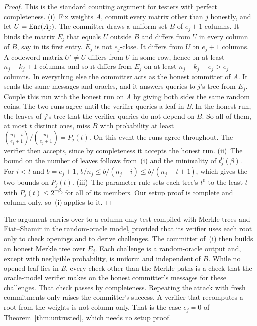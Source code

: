\begin{proof}
This is the standard counting argument for testers with perfect completeness.
(i)~Fix weights $A$, commit every matrix other than $j$ honestly, and let $U=\mathrm{Enc}(A_j)$. The
committer draws a uniform set $B$ of $e_j+1$ columns. It binds the matrix $E_j$ that equals $U$
outside $B$ and differs from $U$ in every column of $B$, say in its first entry. $E_j$ is not
$e_j$-close. It differs from $U$ on $e_j+1$ columns. A codeword matrix $U'\neq U$ differs from $U$
in some row, hence on at least $n_j-k_j+1$ columns, and so it differs from $E_j$ on at least
$n_j-k_j-e_j>e_j$ columns. In everything else the committer acts as the honest committer of $A$. It
sends the same messages and oracles, and it answers queries to $j$'s tree from $E_j$. Couple this
run with the honest run on $A$ by giving both sides the same random coins. The two runs agree until
the verifier queries a leaf in $B$. In the honest run, the leaves of $j$'s tree that the verifier
queries do not depend on $B$. So all of them, at most $t$ distinct ones, miss $B$ with probability
at least $\binom{n_j-t}{e_j+1}\big/\binom{n_j}{e_j+1}=P_j(t)$. On this event the runs agree
throughout. The verifier then accepts, since by completeness it accepts the honest run.
(ii)~The bound on the number of leaves follows from~(i) and the minimality of $t^0_j(\beta)$. For
$i<t$ and $b=e_j+1$, $b/n_j\le b/(n_j-i)\le b/(n_j-t+1)$, which gives the two bounds on $P_j(t)$.
(iii)~The parameter rule sets each tree's $t^0$ to the least $t$ with
$P_j(t)\le2^{-\beta_0}$ for all of its members. Our setup proof is complete and column-only, so~(i)
applies to it.
\end{proof}

 The argument carries over to a column-only test compiled with
Merkle trees and Fiat--Shamir in the random-oracle model, provided that its verifier uses each root
only to check openings and to derive challenges. The committer of~(i) then builds an honest Merkle
tree over $E_j$. Each challenge is a random-oracle output and, except with negligible probability,
is uniform and independent of $B$. While no opened leaf lies in $B$, every check other than the
Merkle paths is a check that the oracle-model verifier makes on the honest committer's messages for
these challenges. That check passes by completeness. Repeating the attack with fresh commitments
only raises the committer's success. A verifier that recomputes a root from the weights is not
column-only. That is the case $e_j=0$ of Theorem~\ref{thm:untrusted}, which needs no setup proof.

